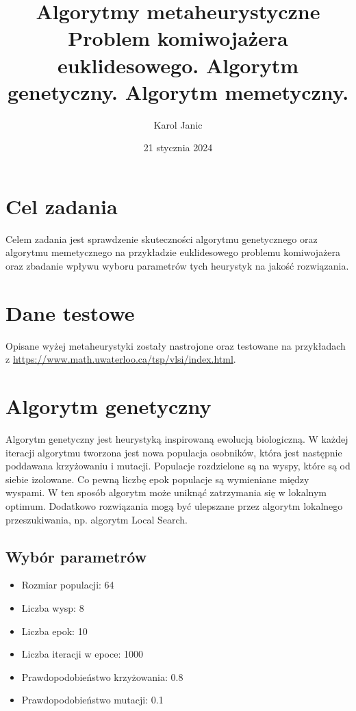 \documentclass{article}
\begin{document}
\begin{titlingpage}
    \title{Algorytmy metaheurystyczne\\[1ex] \large Problem komiwojażera euklidesowego. Algorytm genetyczny. Algorytm memetyczny.}
    \author{Karol Janic}
    \date{21 stycznia 2024}

    \maketitle
\end{titlingpage}

\tableofcontents

\newpage

\section{Cel zadania}
Celem zadania jest sprawdzenie skuteczności algorytmu genetycznego oraz algorytmu memetycznego na przykładzie euklidesowego problemu komiwojażera oraz
zbadanie wpływu wyboru parametrów tych heurystyk na jakość rozwiązania.

\section{Dane testowe}
Opisane wyżej metaheurystyki zostały nastrojone oraz testowane na przykładach z \url{https://www.math.uwaterloo.ca/tsp/vlsi/index.html}.

\section{Algorytm genetyczny}
Algorytm genetyczny jest heurystyką inspirowaną ewolucją biologiczną. W każdej iteracji algorytmu tworzona jest nowa populacja osobników, która jest następnie poddawana krzyżowaniu i mutacji.
Populacje rozdzielone są na wyspy, które są od siebie izolowane. Co pewną liczbę epok populacje są wymieniane między wyspami. W ten sposób algorytm może uniknąć zatrzymania się w lokalnym optimum.
Dodatkowo rozwiązania mogą być ulepszane przez algorytm lokalnego przeszukiwania, np. algorytm Local Search.


\subsection{Wybór parametrów}
\begin{itemize}
    \item Rozmiar populacji: 64
    \item Liczba wysp: 8
    \item Liczba epok: 10
    \item Liczba iteracji w epoce: 1000
    \item Prawdopodobieństwo krzyżowania: 0.8
    \item Prawdopodobieństwo mutacji: 0.1
\end{itemize}
\end{document}
